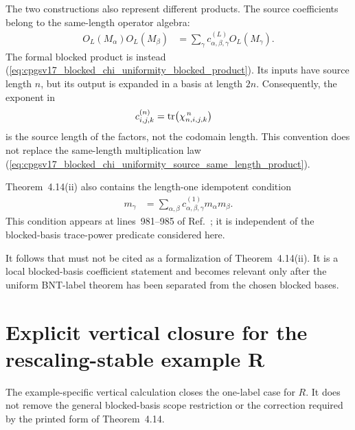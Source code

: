 \documentclass{article}
\begin{document}
The two constructions also represent different products. The source
coefficients belong to the same-length operator algebra:
\begin{align}
    O_L(M_\alpha)O_L(M_\beta)
        &= \sum_\gamma
            c^{(L)}_{\alpha,\beta,\gamma}O_L(M_\gamma).
\label{eq:cpgsv17_blocked_chi_uniformity_source_same_length_product}
\end{align}
The formal blocked product is instead
(\ref{eq:cpgsv17_blocked_chi_uniformity_blocked_product}). Its inputs have
source length $n$, but its output is expanded in a basis at length $2n$.
Consequently, the exponent in
\begin{align}
    c^{(n)}_{i,j,k}
        &= \operatorname{tr}\!\left(\chi_{n,i,j,k}^{\,n}\right)
\label{eq:cpgsv17_blocked_chi_uniformity_source_length_exponent}
\end{align}
is the source length of the factors, not the codomain length. This convention
does not replace the same-length multiplication law
(\ref{eq:cpgsv17_blocked_chi_uniformity_source_same_length_product}).

Theorem~4.14(ii) also contains the length-one idempotent condition
\begin{align}
    m_\gamma
        &= \sum_{\alpha,\beta}
            c^{(1)}_{\alpha,\beta,\gamma}m_\alpha m_\beta.
\label{eq:cpgsv17_blocked_chi_uniformity_source_idempotent_condition}
\end{align}
This condition appears at lines~981--985 of
Ref.~\cite{Cirac2016MPDO_arXiv}; it is independent of the blocked-basis
trace-power predicate considered here.

It follows that
must not be cited as a formalization of Theorem~4.14(ii). It is a local
blocked-basis coefficient statement and becomes relevant only after the
uniform BNT-label theorem has been separated from the chosen blocked bases.

\section{Explicit vertical closure for the rescaling-stable example R}

The example-specific vertical calculation closes the one-label case for $R$.
It does not remove the general blocked-basis scope restriction or the
correction required by the printed form of Theorem~4.14.
\end{document}
